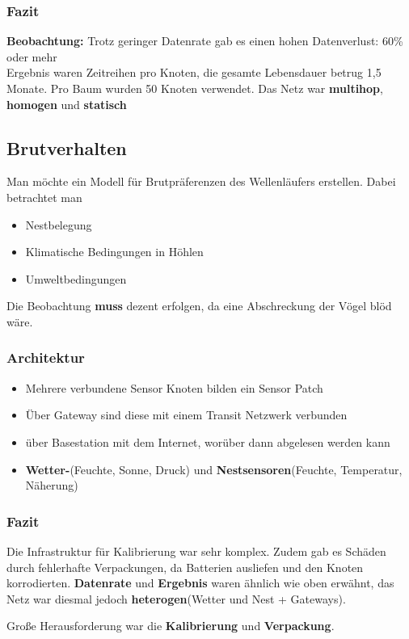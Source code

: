 \documentclass[a4paper]{article}
\begin{document}
\subsubsection{Fazit}
\textbf{Beobachtung:} Trotz geringer Datenrate gab es einen hohen Datenverlust: 60\%  oder mehr\\

Ergebnis waren Zeitreihen pro Knoten, die gesamte Lebensdauer betrug 1,5 Monate. Pro Baum wurden 50 Knoten verwendet. Das Netz war \textbf{multihop}, \textbf{homogen} und \textbf{statisch}

\subsection{Brutverhalten}
Man möchte ein Modell für Brutpräferenzen des Wellenläufers erstellen. Dabei betrachtet man
\begin{itemize}
	\item Nestbelegung
	\item Klimatische Bedingungen in Höhlen
	\item Umweltbedingungen
\end{itemize}	
Die Beobachtung \textbf{muss} dezent erfolgen, da eine Abschreckung der Vögel blöd wäre.
\subsubsection{Architektur}
\begin{itemize}
	\item Mehrere verbundene Sensor Knoten bilden ein Sensor Patch
	\item Über Gateway sind diese mit einem Transit Netzwerk verbunden
	\item über Basestation mit dem Internet, worüber dann abgelesen werden kann
	\item \textbf{Wetter-}(Feuchte, Sonne, Druck) und \textbf{Nestsensoren}(Feuchte, Temperatur, Näherung) 
\end{itemize}
\subsubsection{Fazit}
	Die Infrastruktur für Kalibrierung war sehr komplex. Zudem gab es Schäden durch fehlerhafte Verpackungen, da Batterien ausliefen und den Knoten korrodierten.
	\textbf{Datenrate} und \textbf{Ergebnis} waren ähnlich wie oben erwähnt, das Netz war diesmal jedoch \textbf{heterogen}(Wetter und Nest + Gateways).
	\par Große Herausforderung war die \textbf{Kalibrierung }und \textbf{Verpackung}.
\end{document}
